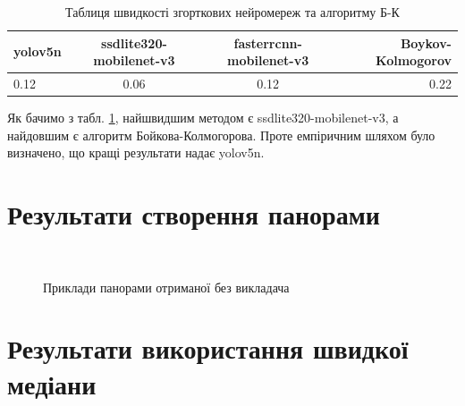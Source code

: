 \begin{table}[H]
    \begin{center}
        \caption{Таблиця швидкості згорткових нейромереж та алгоритму Б-К}
        \label{tab:speed_methods_table}
        \begin{tabular}{l|c|c|r}
            \textbf{yolov5n} & \textbf{ssdlite320-mobilenet-v3} & \textbf{fasterrcnn-mobilenet-v3} & \textbf{Boykov-Kolmogorov} \\
            \hline
            0.12             & 0.06                             & 0.12                             & 0.22                       \\
        \end{tabular}
    \end{center}
\end{table}

Як бачимо з табл. \ref{tab:speed_methods_table}, найшвидшим методом є ssdlite320-mobilenet-v3, 
а найдовшим є алгоритм Бойкова-Колмогорова.
Проте емпіричним шляхом було визначено, що кращі результати надає yolov5n.

\section{Результати створення панорами}

\begin{figure}[H]
    \centering
    \\
    \caption{Приклади панорами отриманої без викладача
    }
\end{figure}


\section{Результати використання швидкої медіани}

